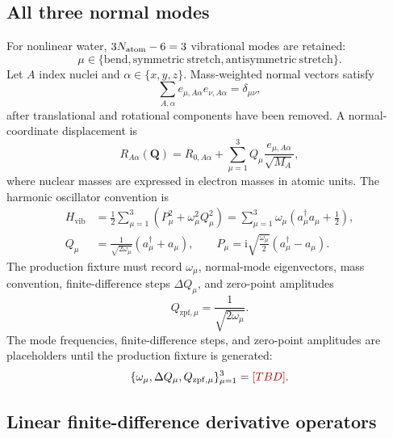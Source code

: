 \documentclass[
  reprint,
  amsmath,
  amssymb,
  aps,
  pra,
  nofootinbib,
  superscriptaddress,
  floatfix
]{revtex4-2}
\newcommand{\placeholder}[1]{\textcolor{red!70!black}{\ifmmode\left[#1\right]\else\textsf{[#1]}\fi}}
\newcommand{\ii}{\mathrm{i}}
\newcommand{\vib}{\mathrm{vib}}
\newcommand{\zpf}{\mathrm{zpf}}
\begin{document}
\subsection{All three normal modes}

For nonlinear water, \(3N_{\rm atom}-6=3\) vibrational modes are retained:
\begin{equation}
\mu\in
\{\mathrm{bend},\mathrm{symmetric\ stretch},\mathrm{antisymmetric\ stretch}\}.
\label{eq:three_modes}
\end{equation}
Let \(A\) index nuclei and \(\alpha\in\{x,y,z\}\).  Mass-weighted normal vectors satisfy
\begin{equation}
\sum_{A,\alpha}
e_{\mu,A\alpha}e_{\nu,A\alpha}
=
\delta_{\mu\nu},
\label{eq:normal_mode_orthonormal}
\end{equation}
after translational and rotational components have been removed.  A normal-coordinate displacement is
\begin{equation}
R_{A\alpha}(\mathbf Q)
=
R_{0,A\alpha}
+
\sum_{\mu=1}^{3}
Q_\mu
\frac{e_{\mu,A\alpha}}{\sqrt{M_A}},
\label{eq:mass_weighted_displacement}
\end{equation}
where nuclear masses are expressed in electron masses in atomic units.  The harmonic oscillator convention is
\begin{align}
H_{\vib}
&=
\frac12
\sum_{\mu=1}^{3}
\left(P_\mu^2+\omega_\mu^2Q_\mu^2\right)
=
\sum_{\mu=1}^{3}
\omega_\mu\left(a_\mu^\dagger a_\mu+\frac12\right),
\nonumber\\
Q_\mu
&=
\frac{1}{\sqrt{2\omega_\mu}}
\left(a_\mu^\dagger+a_\mu\right),
\qquad
P_\mu
=
\ii\sqrt{\frac{\omega_\mu}{2}}
\left(a_\mu^\dagger-a_\mu\right).
\label{eq:q_p_ladder}
\end{align}
The production fixture must record \(\omega_\mu\), normal-mode eigenvectors, mass convention, finite-difference steps \(\Delta Q_\mu\), and zero-point amplitudes
\begin{equation}
Q_{\zpf,\mu}
=
\frac{1}{\sqrt{2\omega_\mu}}.
\label{eq:qzpf}
\end{equation}
The mode frequencies, finite-difference steps, and zero-point amplitudes are placeholders until the production fixture is generated:
\begin{equation}
\{
\omega_\mu,\Delta Q_\mu,Q_{\zpf,\mu}
\}_{\mu=1}^{3}
=
\placeholder{TBD}.
\label{eq:normal_mode_placeholders}
\end{equation}

\subsection{Linear finite-difference derivative operators}
\end{document}

